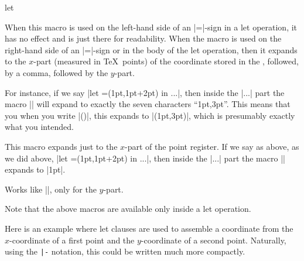 \begin{pathoperation}{let}{
    }
\begin{codeexample}[]
\end{codeexample}

  \begin{command}{\p{}}
    When this macro is used on the left-hand side of an |=|-sign in a
    let operation, it has no effect and is just there for
    readability. When the macro is used on the right-hand side of an
    |=|-sign or in the body of the let operation, then it expands to
    the $x$-part (measured in \TeX\ points) of the coordinate stored
    in the , followed, by a comma, followed by the
    $y$-part.

    For instance, if we say |let =(1pt,1pt+2pt) in ...|, then
    inside the |...| part the macro || will expand to exactly the
    seven characters ``1pt,3pt''. This means that you when you write
    |()|, this expands to |(1pt,3pt)|, which is presumably exactly
    what you intended.
  \end{command}
  \begin{command}{\x{}}
    This macro expands just to the $x$-part of the point
    register. If we say as above, as we did above,
    |let =(1pt,1pt+2pt) in ...|, then
    inside the |...| part the macro || expands to |1pt|.
  \end{command}
  \begin{command}{\y{}}
    Works like |\x|, only for the $y$-part.
  \end{command}
  Note that the above macros are available only inside a let
  operation.

  Here is an example where let clauses are used to assemble a coordinate
  from the $x$-coordinate of a first point and the $y$-coordinate of a
  second point. Naturally, using the \verb!|-! notation, this could be
  written much more compactly.
\begin{codeexample}[]
\end{codeexample}


\end{pathoperation}
